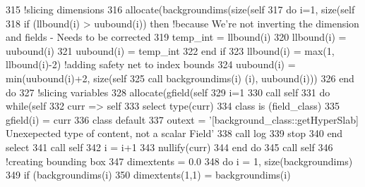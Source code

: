 \begin{DoxyCode}
315     \textcolor{comment}{!slicing dimensions}
316     \textcolor{keyword}{allocate}(backgroundims(\textcolor{keyword}{size}(self%
317     \textcolor{keywordflow}{do} i=1, \textcolor{keyword}{size}(self%
318         \textcolor{keywordflow}{if} (llbound(i) > uubound(i)) \textcolor{keywordflow}{then} \textcolor{comment}{!because We're not inverting the dimension and fields - Needs to
       be corrected}
319             temp\_int = llbound(i)
320             llbound(i) = uubound(i)
321             uubound(i) = temp\_int
322 \textcolor{keywordflow}{        end if}
323         llbound(i) = max(1, llbound(i)-2) \textcolor{comment}{!adding safety net to index bounds}
324         uubound(i) = min(uubound(i)+2, \textcolor{keyword}{size}(self%
325         \textcolor{keyword}{call }backgroundims(i)%
      (i), uubound(i)))
326 \textcolor{keywordflow}{    end do}
327     \textcolor{comment}{!slicing variables}
328     \textcolor{keyword}{allocate}(gfield(self%
329     i=1
330     \textcolor{keyword}{call }self%
331     \textcolor{keywordflow}{do} \textcolor{keywordflow}{while}(self%
332         curr => self%
333         \textcolor{keywordflow}{select type}(curr)
334 \textcolor{keywordflow}{        class is} (field\_class)
335             gfield(i) = curr%
336 \textcolor{keywordflow}{            class default}
337             outext = \textcolor{stringliteral}{'[background\_class::getHyperSlab] Unexepected type of content, not a scalar Field'}
338             \textcolor{keyword}{call }log%
339             stop
340 \textcolor{keywordflow}{        end select}
341         \textcolor{keyword}{call }self%
342         i = i+1
343         \textcolor{keyword}{nullify}(curr)
344 \textcolor{keywordflow}{    end do}
345     \textcolor{keyword}{call }self%
346     \textcolor{comment}{!creating bounding box}
347     dimextents = 0.0
348     \textcolor{keywordflow}{do} i = 1, \textcolor{keyword}{size}(backgroundims)
349         \textcolor{keywordflow}{if} (backgroundims(i)%
350             dimextents(1,1) = backgroundims(i)%

\end{DoxyCode}
